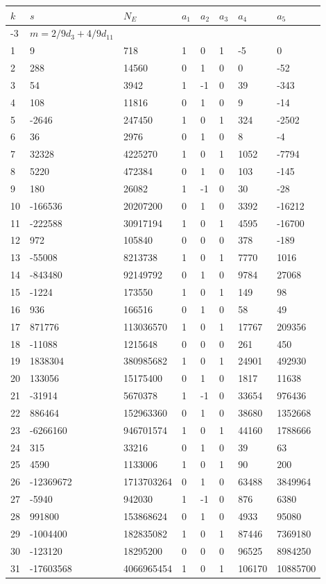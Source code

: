 \documentclass{amsart}
\begin{document}
\begin{longtable}{|l|l|l|lllll|}
\hline
$k$ & $s$ & $N_E$ & $a_1$ & $a_2$ & $a_3$ & $a_4$ & $a_5$\\
\hline
-3&$m=2/9d_{3}+4/9d_{11}$&&\multicolumn{5}{c|}{}\\
1&9&718&1&0&1&-5&0\\
2&288&14560&0&1&0&0&-52\\
3&54&3942&1&-1&0&39&-343\\
4&108&11816&0&1&0&9&-14\\
5&-2646&247450&1&0&1&324&-2502\\
6&36&2976&0&1&0&8&-4\\
7&32328&4225270&1&0&1&1052&-7794\\
8&5220&472384&0&1&0&103&-145\\
9&180&26082&1&-1&0&30&-28\\
10&-166536&20207200&0&1&0&3392&-16212\\
11&-222588&30917194&1&0&1&4595&-16700\\
12&972&105840&0&0&0&378&-189\\
13&-55008&8213738&1&0&1&7770&1016\\
14&-843480&92149792&0&1&0&9784&27068\\
15&-1224&173550&1&0&1&149&98\\
16&936&166516&0&1&0&58&49\\
17&871776&113036570&1&0&1&17767&209356\\
18&-11088&1215648&0&0&0&261&450\\
19&1838304&380985682&1&0&1&24901&492930\\
20&133056&15175400&0&1&0&1817&11638\\
21&-31914&5670378&1&-1&0&33654&976436\\
22&886464&152963360&0&1&0&38680&1352668\\
23&-6266160&946701574&1&0&1&44160&1788666\\
24&315&33216&0&1&0&39&63\\
25&4590&1133006&1&0&1&90&200\\
26&-12369672&1713703264&0&1&0&63488&3849964\\
27&-5940&942030&1&-1&0&876&6380\\
28&991800&153868624&0&1&0&4933&95080\\
29&-1004400&182835082&1&0&1&87446&7369180\\
30&-123120&18295200&0&0&0&96525&8984250\\
31&-17603568&4066965454&1&0&1&106170&10885700\\

\end{longtable}
\end{document}
